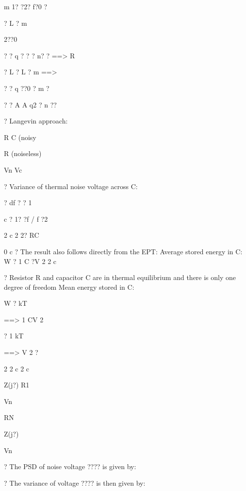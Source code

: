 \documentclass[2pt,landscape]{article}
\begin{document}
\begin{multicols*}{5}
m	1? ?2? f?0 ?


?	L	?	m


2??0


? ? q ? ? ? n?
? ==> R


?	L	? L ?	m
==>



? ? q ??0	?
m	?


? ? A	A 
q2 ? n ??







?	Langevin approach:




R	C
(noisy


R (noiseless)

Vn	Vc



?	Variance of thermal noise voltage across C:

?	df	?	?	1



c	? 1? ?f / f  ?2





2	c	2	2? 
RC


0	c
?	The result also follows directly from the EPT: 
Average stored energy in C:
W ? 1 C ?V 2
2	c

?	Resistor R and capacitor C are in thermal equilibrium and there is only one 
degree of freedom
Mean energy stored in C:



W ? kT


==> 1 CV 2



? 1 kT




==> V 2 ?



2	2	c	2	c






Z(j?)
R1

Vn

RN


Z(j?)


Vn







?	The PSD of noise voltage ???? is given by:



?	The variance of voltage ???? is then given by:






\end{multicols*}
\end{document}
